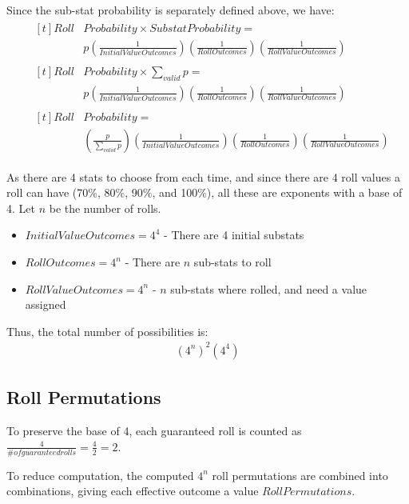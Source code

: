 \documentclass[12pt]{article}
\begin{document}
Since the sub-stat probability is separately defined above, we have:
\begin{align*}
	&\begin{aligned}[t]Roll&Probability \times SubstatProbability = \\
	&p\left(\frac{1}{InitialValueOutcomes}\right)\left(\frac{1}{RollOutcomes}\right)\left(\frac{1}{RollValueOutcomes}\right)\end{aligned} \\[12pt]
	&\begin{aligned}[t]Roll&Probability \times \sum_{valid} p = \\
	&p\left(\frac{1}{InitialValueOutcomes}\right)\left(\frac{1}{RollOutcomes}\right)\left(\frac{1}{RollValueOutcomes}\right)\end{aligned} \\[12pt]
	&\begin{aligned}[t]Roll&Probability = \\
	&\left(\frac{p}{\sum_{valid} p}\right)\left(\frac{1}{InitialValueOutcomes}\right)\left(\frac{1}{RollOutcomes}\right)\left(\frac{1}{RollValueOutcomes}\right)\end{aligned}
\end{align*}

As there are 4 stats to choose from each time, and since there are 4 roll values a roll can have (70\%, 80\%, 90\%, and 100\%), all these are exponents with a base of 4. Let $n$ be the number of rolls.
\begin{itemize}[]
	\item $InitialValueOutcomes = 4^4$ - There are 4 initial substats
	\item $RollOutcomes = 4^n$ - There are $n$ sub-stats to roll
	\item $RollValueOutcomes = 4^n$ - $n$ sub-stats where rolled, and need a value assigned
\end{itemize}

Thus, the total number of possibilities is:
\begin{align*}
	(4^n)^2(4^4)
\end{align*}

\subsection{Roll Permutations}

To preserve the base of 4, each guaranteed roll is counted as $\frac{4}{\# of guaranteed rolls} = \frac{4}{2} = 2$.

To reduce computation, the computed $4^n$ roll permutations are combined into combinations, giving each effective outcome a value $RollPermutations$.
\end{document}
